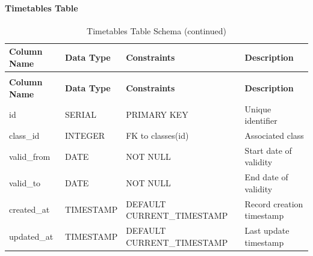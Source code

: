 \documentclass[12pt,a4paper]{report}
\begin{document}
\paragraph{Timetables Table}
\begin{longtable}{|p{3cm}|p{3cm}|p{2cm}|p{6cm}|}
\caption{Timetables Table Schema}
\label{tab:timetables}\\
\hline
\textbf{Column Name} & \textbf{Data Type} & \textbf{Constraints} & \textbf{Description} \\
\hline
\endfirsthead
\caption[]{Timetables Table Schema (continued)}\\
\hline
\textbf{Column Name} & \textbf{Data Type} & \textbf{Constraints} & \textbf{Description} \\
\hline
\endhead
id & SERIAL & PRIMARY KEY & Unique identifier \\
\hline
class\_id & INTEGER & FK to classes(id) & Associated class \\
\hline
valid\_from & DATE & NOT NULL & Start date of validity \\
\hline
valid\_to & DATE & NOT NULL & End date of validity \\
\hline
created\_at & TIMESTAMP & DEFAULT CURRENT\_TIMESTAMP & Record creation timestamp \\
\hline
updated\_at & TIMESTAMP & DEFAULT CURRENT\_TIMESTAMP & Last update timestamp \\
\hline
\end{longtable}
\end{document}
